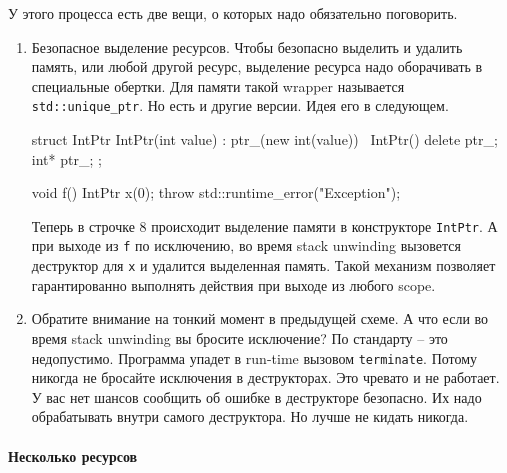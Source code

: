У этого процесса есть две вещи, о которых надо обязательно поговорить.
\begin{enumerate}
\item Безопасное выделение ресурсов.
Чтобы безопасно выделить и удалить память, или любой другой ресурс, выделение ресурса надо оборачивать в специальные обертки.
Для памяти такой wrapper называется \verb"std::unique_ptr".
Но есть и другие версии.
Идея его в следующем.
\begin{cppcode}
struct IntPtr {
  IntPtr(int value) : ptr_(new int(value)) {}
  ~IntPtr() { delete ptr_;}
  int* ptr_;
};

void f() {
  IntPtr x(0);
  throw std::runtime_error("Exception");
}
\end{cppcode}
Теперь в строчке 8 происходит выделение памяти в конструкторе \verb"IntPtr".
А при выходе из \verb"f" по исключению, во время stack unwinding вызовется деструктор для \verb"x" и удалится выделенная память.
Такой механизм позволяет гарантированно выполнять действия при выходе из любого scope.

\item Обратите внимание на тонкий момент в предыдущей схеме.
А что если во время stack unwinding вы бросите исключение?
По стандарту -- это недопустимо.
Программа упадет в run-time вызовом \verb"terminate".
Потому никогда не бросайте исключения в деструкторах.
Это чревато и не работает.
У вас нет шансов сообщить об ошибке в деструкторе безопасно.
Их надо обрабатывать внутри самого деструктора.
Но лучше не кидать никогда.
\end{enumerate}

\paragraph{Несколько ресурсов}


